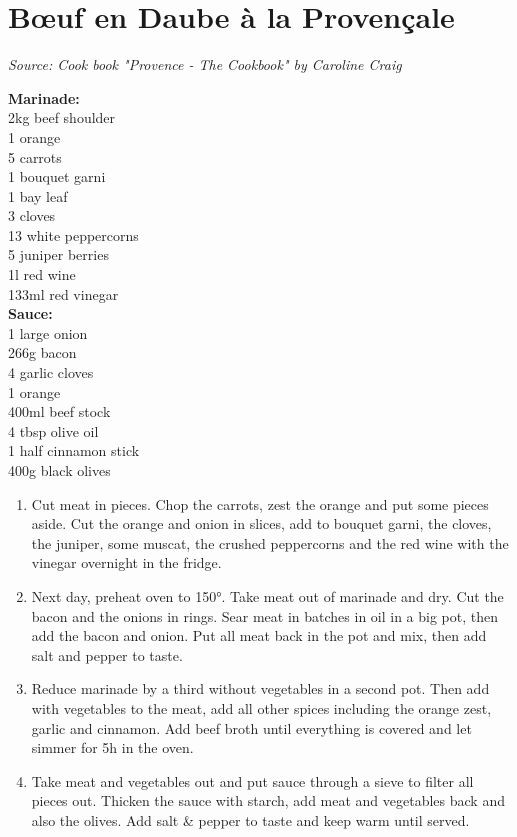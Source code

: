\documentclass{report}
\begin{document}
\section{Bœuf en Daube à la Provençale}
\textit{Source: Cook book "Provence - The Cookbook" by Caroline Craig}\\
\begin{minipage}[t]{0.21\textwidth} \vspace{0pt} 
\textbf{Marinade:}\\
2kg beef shoulder\\
1 orange\\
5 carrots\\
1 bouquet garni\\
1 bay leaf\\
3 cloves\\
13 white peppercorns\\
5 juniper berries\\
1l red wine\\
133ml red vinegar\\

\textbf{Sauce:}\\
1 large onion\\
266g bacon\\
4 garlic cloves\\
1 orange\\
400ml beef stock\\
4 tbsp olive oil\\
1 half cinnamon stick\\
400g black olives
\end{minipage}
\hfill
\begin{minipage}[t]{0.78\textwidth} \vspace{0pt}
	\begin{enumerate}
		\item Cut meat in pieces. Chop the carrots, zest the orange and put some pieces aside. Cut the orange and onion in slices, add to bouquet garni, the cloves, the juniper, some muscat, the crushed peppercorns and the red wine with the vinegar overnight in the fridge.
		\item Next day, preheat oven to 150°. Take meat out of marinade and dry. Cut the bacon and the onions in rings. Sear meat in batches in oil in a big pot, then add the bacon and onion. Put all meat back in the pot and mix, then add salt and pepper to taste.
		\item Reduce marinade by a third without vegetables in a second pot. Then add with vegetables to the meat, add all other spices including the orange zest, garlic and cinnamon. Add beef broth until everything is covered and let simmer for 5h in the oven.
		\item Take meat and vegetables out and put sauce through a sieve to filter all pieces out. Thicken the sauce with starch, add meat and vegetables back and also the olives. Add salt \& pepper to taste and keep warm until served.
	\end{enumerate}	
\end{minipage}
\end{document}
